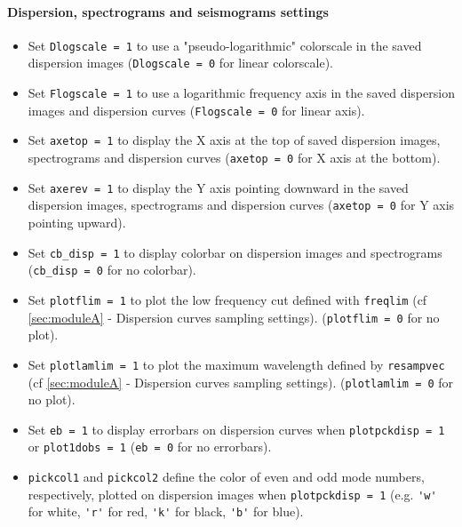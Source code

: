 \documentclass[twoside,a4paper]{article}
\begin{document}
\paragraph{Dispersion, spectrograms and seismograms settings}
\begin{itemize}[leftmargin=*]
\setlength\itemsep{2ex}
\item Set \verb|Dlogscale = 1| to use a "pseudo-logarithmic" colorscale in the saved dispersion images (\verb|Dlogscale = 0| for linear colorscale).

\item Set \verb|Flogscale = 1| to use a logarithmic frequency axis in the saved dispersion images and dispersion curves (\verb|Flogscale = 0| for linear axis).

\item Set \verb|axetop = 1| to display the X axis at the top of saved dispersion images, spectrograms and dispersion curves (\verb|axetop = 0| for X axis at the bottom).

\item Set \verb|axerev = 1| to display the Y axis pointing downward in the saved dispersion images, spectrograms and dispersion curves (\verb|axetop = 0| for Y axis pointing upward).

\item Set \verb|cb_disp = 1| to display colorbar on dispersion images and spectrograms (\verb|cb_disp = 0| for no colorbar).

\item Set \verb|plotflim = 1| to plot the low frequency cut defined with \verb|freqlim| (cf \ref{sec:moduleA} - Dispersion curves sampling settings). (\verb|plotflim = 0| for no plot).

\item Set \verb|plotlamlim = 1| to plot the maximum wavelength defined by \verb|resampvec| (cf \ref{sec:moduleA} - Dispersion curves sampling settings). (\verb|plotlamlim = 0| for no plot).

\item Set \verb|eb = 1| to display errorbars on dispersion curves when \verb|plotpckdisp = 1| or \verb|plot1dobs = 1| (\verb|eb = 0| for no errorbars).

\item \verb|pickcol1| and \verb|pickcol2| define the color of even and odd mode numbers, respectively, plotted on dispersion images when \verb|plotpckdisp = 1| (e.g. \verb|'w'| for white, \verb|'r'| for red, \verb|'k'| for black, \verb|'b'| for blue).\\[2ex]


\end{itemize}
\end{document}
